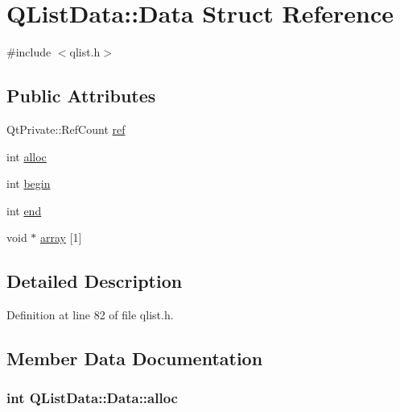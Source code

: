 \hypertarget{struct_q_list_data_1_1_data}{}\section{Q\+List\+Data\+:\+:Data Struct Reference}
\label{struct_q_list_data_1_1_data}


{\ttfamily \#include $<$qlist.\+h$>$}

\subsection*{Public Attributes}
\begin{DoxyCompactItemize}
\item 
Qt\+Private\+::\+Ref\+Count \hyperlink{struct_q_list_data_1_1_data_ae8b0e0ecd9cf79d6b787c328096f2ff9}{ref}
\item 
int \hyperlink{struct_q_list_data_1_1_data_a7d5498c94bdf277967ca9c51db749786}{alloc}
\item 
int \hyperlink{struct_q_list_data_1_1_data_a72b722ed04d2ba8e83dbf67f27d3c743}{begin}
\item 
int \hyperlink{struct_q_list_data_1_1_data_a9e472fb47499e6a368429e85441aad94}{end}
\item 
void $\ast$ \hyperlink{struct_q_list_data_1_1_data_af5c124359e9bc2e895ac22f115920de4}{array} \mbox{[}1\mbox{]}
\end{DoxyCompactItemize}


\subsection{Detailed Description}


Definition at line 82 of file qlist.\+h.



\subsection{Member Data Documentation}
\subsubsection[{\texorpdfstring{alloc}{alloc}}]{\setlength{\rightskip}{0pt plus 5cm}int Q\+List\+Data\+::\+Data\+::alloc}\hypertarget{struct_q_list_data_1_1_data_a7d5498c94bdf277967ca9c51db749786}{}\label{struct_q_list_data_1_1_data_a7d5498c94bdf277967ca9c51db749786}


